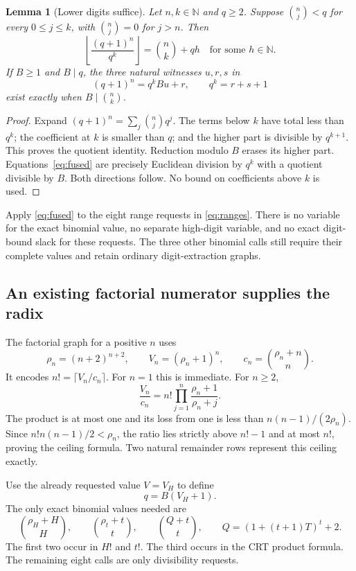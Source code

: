 \documentclass[10pt,letterpaper]{article}
\newtheorem{lemma}[theorem]{Lemma}
\theoremstyle{definition}\newtheorem{definition}[theorem]{Definition}
\theoremstyle{remark}\newtheorem{remark}[theorem]{Remark}
\newcommand{\N}{\mathbb N}\newcommand{\Z}{\mathbb Z}\newcommand{\Q}{\mathbb Q}
\begin{document}
\begin{lemma}[Lower digits suffice]\label{lem:lowdigits}
Let $n,k\in\N$ and $q\ge2$. Suppose
$\binom nj<q$ for every $0\le j\le k$, with $\binom nj=0$ for $j>n$.
Then
\[
 \left\lfloor\frac{(q+1)^n}{q^k}\right\rfloor
       =\binom nk+q h\quad\text{for some }h\in\N.
\]
If $B\ge1$ and $B\mid q$, the three natural witnesses $u,r,s$ in
\begin{equation}\label{eq:fused}
 (q+1)^n=q^k B u+r,\qquad q^k=r+s+1
\end{equation}
exist exactly when $B\mid\binom nk$.
\end{lemma}
\begin{proof}
Expand $(q+1)^n=\sum_j\binom njq^j$. The terms below $k$ have total
less than $q^k$; the coefficient at $k$ is smaller than $q$; and the
higher part is divisible by $q^{k+1}$. This proves the quotient identity.
Reduction modulo $B$ erases its higher part. Equations~\eqref{eq:fused}
are precisely Euclidean division by $q^k$ with a quotient divisible by
$B$. Both directions follow. No bound on coefficients above $k$ is used.
\end{proof}

Apply \eqref{eq:fused} to the eight range requests in
\eqref{eq:ranges}. There is no variable for the exact binomial value,
no separate high-digit variable, and no exact digit-bound slack for
these requests. The three other binomial calls still require their
complete values and retain ordinary digit-extraction graphs.

\subsection{An existing factorial numerator supplies the radix}

The factorial graph for a positive $n$ uses
\begin{equation}\label{eq:factorialsemantic}
 \rho_n=(n+2)^{n+2},\qquad V_n=(\rho_n+1)^n,
 \qquad c_n=\binom{\rho_n+n}{n}.
\end{equation}
It encodes $n!=\lceil V_n/c_n\rceil$. For $n=1$ this is immediate.
For $n\ge2$,
\[
 \frac{V_n}{c_n}=n!\prod_{j=1}^n\frac{\rho_n+1}{\rho_n+j}.
\]
The product is at most one and its loss from one is less than
$n(n-1)/(2\rho_n)$. Since $n!n(n-1)/2<\rho_n$, the ratio lies strictly
above $n!-1$ and at most $n!$, proving the ceiling formula.
Two natural remainder rows represent this ceiling exactly.

Use the already requested value $V=V_H$ to define
\begin{equation}\label{eq:recycled}
 \boxed{q=B(V_H+1).}
\end{equation}
The only exact binomial values needed are
\[
 \binom{\rho_H+H}{H},\qquad
 \binom{\rho_t+t}{t},\qquad
 \binom{Q+t}{t},\qquad
 Q=(1+(t+1)T)^t+2.
\]
The first two occur in $H!$ and $t!$. The third occurs in the CRT product
formula. The remaining eight calls are only divisibility requests.
\end{document}
